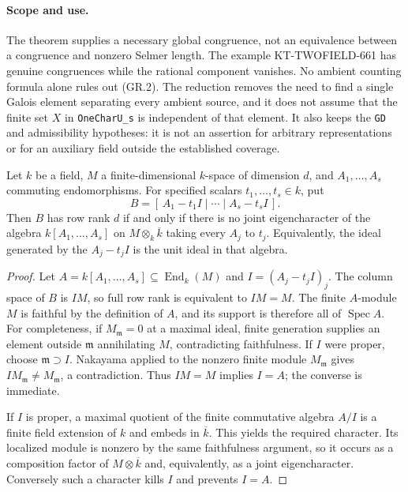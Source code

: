 \paragraph{Scope and use.}
The theorem supplies a necessary global congruence, not an
equivalence between a congruence and nonzero Selmer length.
The example KT-TWOFIELD-661 has genuine congruences while
the rational component vanishes. No ambient counting
formula alone rules out (GR.2). The reduction removes the
need to find a single Galois element separating every
ambient source, and it does not assume that the finite set
$X$ in \texttt{OneCharU\_s} is independent of that element.
It also keeps the \texttt{GD} and admissibility hypotheses:
it is not an assertion for arbitrary representations or
for an auxiliary field outside the established coverage.

\begin{proposition}
Let $k$ be a field, $M$ a finite-dimensional $k$-space of
dimension $d$, and $A_1,\ldots,A_s$ commuting endomorphisms.
For specified scalars $t_1,\ldots,t_s\in k$, put
\[
 B=[\,A_1-t_1I\mid\cdots\mid A_s-t_sI\,].
                                                               \tag{GR.6}
\]
Then $B$ has row rank $d$ if and only if there is no
joint eigencharacter of the algebra $k[A_1,\ldots,A_s]$
on $M\otimes_k\overline k$ taking every $A_j$ to $t_j$.
Equivalently, the ideal generated by the $A_j-t_jI$ is
the unit ideal in that algebra.
\end{proposition}

\begin{proof}
Let $A=k[A_1,\ldots,A_s]\subseteq\operatorname{End}_k(M)$
and $I=(A_j-t_jI)_j$. The column space of $B$ is $IM$,
so full row rank is equivalent to $IM=M$.
The finite $A$-module $M$ is faithful by the definition of
$A$, and its support is therefore all of $\operatorname{Spec}A$.
For completeness, if $M_{\mathfrak m}=0$ at a maximal ideal,
finite generation supplies an element outside $\mathfrak m$
annihilating $M$, contradicting faithfulness. If $I$ were
proper, choose $\mathfrak m\supset I$. Nakayama applied to
the nonzero finite module $M_{\mathfrak m}$ gives
$IM_{\mathfrak m}\ne M_{\mathfrak m}$, a contradiction.
Thus $IM=M$ implies $I=A$; the converse is immediate.

If $I$ is proper, a maximal quotient of the finite
commutative algebra $A/I$ is a finite field extension of
$k$ and embeds in $\overline k$. This yields the required
character. Its localized module is nonzero by the same
faithfulness argument, so it occurs as a composition
factor of $M\otimes\overline k$ and, equivalently, as a
joint eigencharacter. Conversely such a character kills
$I$ and prevents $I=A$.
\end{proof}

